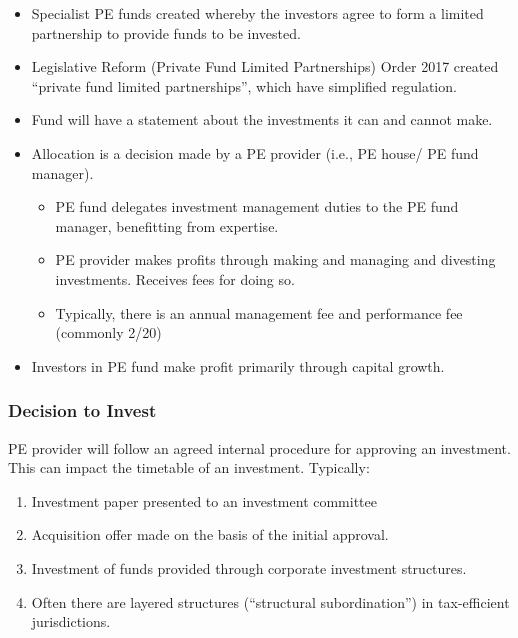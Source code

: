 \documentclass[
]{article}
\providecommand{\tightlist}{%
  \setlength{\itemsep}{0pt}\setlength{\parskip}{0pt}}
\begin{document}
\begin{itemize}
\tightlist
\item
  Specialist PE funds created whereby the investors agree to form a
  limited partnership to provide funds to be invested.
\item
  Legislative Reform (Private Fund Limited Partnerships) Order 2017
  created ``private fund limited partnerships'', which have simplified
  regulation.
\item
  Fund will have a statement about the investments it can and cannot
  make.
\item
  Allocation is a decision made by a PE provider (i.e., PE house/ PE
  fund manager).

  \begin{itemize}
  \tightlist
  \item
    PE fund delegates investment management duties to the PE fund
    manager, benefitting from expertise.
  \item
    PE provider makes profits through making and managing and divesting
    investments. Receives fees for doing so.
  \item
    Typically, there is an annual management fee and performance fee
    (commonly 2/20)
  \end{itemize}
\item
  Investors in PE fund make profit primarily through capital growth.
\end{itemize}

\hypertarget{decision-to-invest}{%
\subsubsection{Decision to Invest}\label{decision-to-invest}}

PE provider will follow an agreed internal procedure for approving an
investment. This can impact the timetable of an investment. Typically:

\begin{enumerate}
\def\labelenumi{\arabic{enumi}.}
\tightlist
\item
  Investment paper presented to an investment committee
\item
  Acquisition offer made on the basis of the initial approval.
\item
  Investment of funds provided through corporate investment structures.
\item
  Often there are layered structures (``structural subordination'') in
  tax-efficient jurisdictions.
\end{enumerate}
\end{document}
